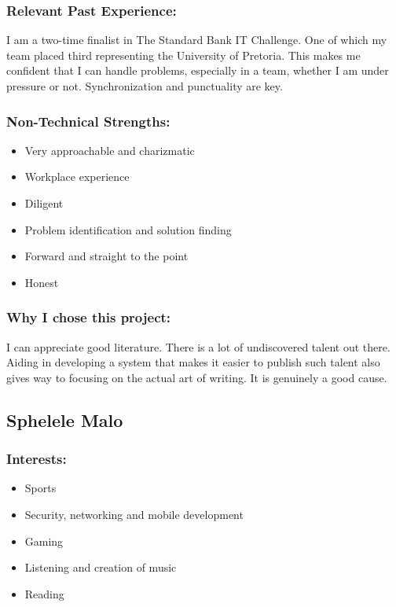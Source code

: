 \subsubsection{Relevant Past Experience:}
\par{I am a two-time finalist in The Standard Bank IT Challenge. One of which my team placed third representing the University of Pretoria. This makes me confident that I can handle problems, especially in a team, whether I am under pressure or not. Synchronization and punctuality are key.}

\subsubsection{Non-Technical Strengths:}
\begin{itemize}
	\item Very approachable and charizmatic
	\item Workplace experience
	\item Diligent
	\item Problem identification and solution finding
	\item Forward and straight to the point
	\item Honest
\end{itemize}

\subsubsection{Why I chose this project:}
\par{I can appreciate good literature. There is a lot of undiscovered talent out there. Aiding in developing a system that makes it easier to publish such talent also gives way to focusing on the actual art of writing. It is genuinely a good cause.}

\newpage
\subsection{Sphelele Malo}
\subsubsection{Interests:}
	\begin{itemize}
		\item Sports
		\item Security, networking and mobile development
		\item Gaming
		\item Listening and creation of music 
		\item Reading 
	\end{itemize}
